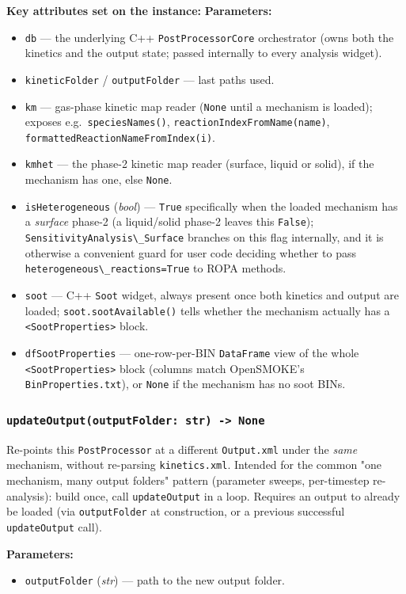\documentclass[11pt,a4paper]{report}
\newcommand{\pymethod}[1]{\subsubsection{\texttt{#1}}}
\newenvironment{params}{\vspace{1mm}\noindent\textbf{Parameters:}\begin{itemize}[leftmargin=1.1cm,label={--},itemsep=1pt,topsep=2pt]}{\end{itemize}}
\newcommand{\pkg}[1]{\lstinline|#1|}
\begin{document}
\vspace{1mm}\noindent\textbf{Key attributes set on the instance:}
\begin{params}
\item \pkg{db} --- the underlying C++ \pkg{PostProcessorCore} orchestrator
  (owns both the kinetics and the output state; passed internally to every
  analysis widget).
\item \pkg{kineticFolder} / \pkg{outputFolder} --- last paths used.
\item \pkg{km} --- gas-phase kinetic map reader (\pkg{None} until a
  mechanism is loaded); exposes e.g.\ \pkg{speciesNames()},
  \pkg{reactionIndexFromName(name)}, \pkg{formattedReactionNameFromIndex(i)}.
\item \pkg{kmhet} --- the phase-2 kinetic map reader (surface, liquid or
  solid), if the mechanism has one, else \pkg{None}.
\item \pkg{isHeterogeneous} (\textit{bool}) --- \pkg{True} specifically when
  the loaded mechanism has a \emph{surface} phase-2 (a liquid/solid phase-2
  leaves this \pkg{False}); \pkg{SensitivityAnalysis\_Surface} branches on
  this flag internally, and it is otherwise a convenient guard for user code
  deciding whether to pass \pkg{heterogeneous\_reactions=True} to ROPA
  methods.
\item \pkg{soot} --- C++ \pkg{Soot} widget, always present once both
  kinetics and output are loaded; \pkg{soot.sootAvailable()} tells whether
  the mechanism actually has a \pkg{<SootProperties>} block.
\item \pkg{dfSootProperties} --- one-row-per-BIN \pkg{DataFrame} view of the
  whole \pkg{<SootProperties>} block (columns match OpenSMOKE's
  \pkg{BinProperties.txt}), or \pkg{None} if the mechanism has no soot BINs.
\end{params}

\pymethod{updateOutput(outputFolder: str) -> None}

Re-points this \pkg{PostProcessor} at a different \pkg{Output.xml} under the
\emph{same} mechanism, without re-parsing \pkg{kinetics.xml}. Intended for
the common "one mechanism, many output folders" pattern (parameter sweeps,
per-timestep re-analysis): build once, call \pkg{updateOutput} in a loop.
Requires an output to already be loaded (via \pkg{outputFolder} at
construction, or a previous successful \pkg{updateOutput} call).

\begin{params}
\item \pkg{outputFolder} (\textit{str}) --- path to the new output folder.
\end{params}
\end{document}
